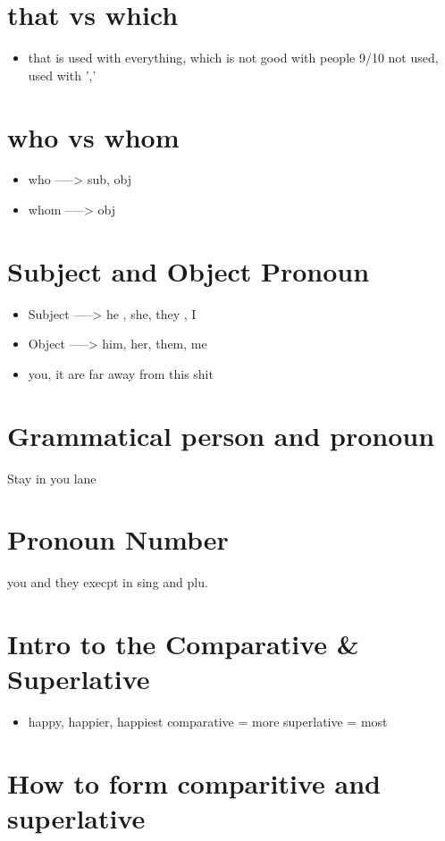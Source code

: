 \documentclass[11pt]{article}
\begin{document}
\section{that vs which}
\label{sec:orge1236f0}
\begin{itemize}
\item that is used with everything, which is not good with people 9/10 not used, used with ','
\end{itemize}
\section{who vs whom}
\label{sec:org3938206}
\begin{itemize}
\item who -----> sub, obj
\item whom -----> obj
\end{itemize}
\section{Subject and Object Pronoun}
\label{sec:org0ea632d}
\begin{itemize}
\item Subject -----> he , she, they , I
\item Object  -----> him, her, them, me
\item you, it are far away from this shit
\end{itemize}
\section{Grammatical person and pronoun}
\label{sec:org0e894f8}
Stay in you lane
\section{Pronoun Number}
\label{sec:orgfe80556}
you and they execpt in sing and plu.

\section{Intro to the Comparative \& Superlative}
\label{sec:org0a19bc1}
\begin{itemize}
\item happy, happier, happiest
comparative = more
superlative = most
\end{itemize}
\section{How to form comparitive and superlative}
\label{sec:orgc2d9e62}
\end{document}
